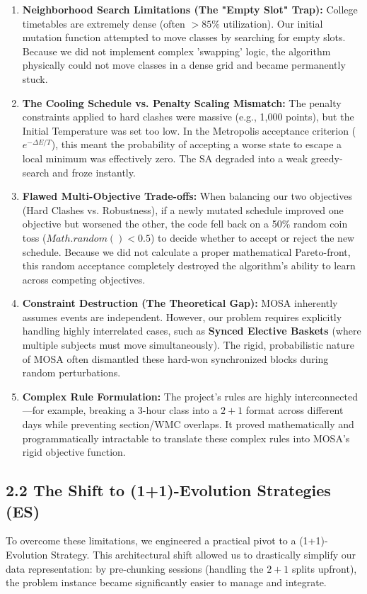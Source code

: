 \documentclass{article}
\begin{document}
\begin{enumerate}
    \item \textbf{Neighborhood Search Limitations (The "Empty Slot" Trap):} College timetables are extremely dense (often $> 85\%$ utilization). Our initial mutation function attempted to move classes by searching for empty slots. Because we did not implement complex 'swapping' logic, the algorithm physically could not move classes in a dense grid and became permanently stuck.
    \item \textbf{The Cooling Schedule vs. Penalty Scaling Mismatch:} The penalty constraints applied to hard clashes were massive (e.g., 1,000 points), but the Initial Temperature was set too low. In the Metropolis acceptance criterion ($e^{-\Delta E / T}$), this meant the probability of accepting a worse state to escape a local minimum was effectively zero. The SA degraded into a weak greedy-search and froze instantly.
    \item \textbf{Flawed Multi-Objective Trade-offs:} When balancing our two objectives (Hard Clashes vs. Robustness), if a newly mutated schedule improved one objective but worsened the other, the code fell back on a 50\% random coin toss ($Math.random() < 0.5$) to decide whether to accept or reject the new schedule. Because we did not calculate a proper mathematical Pareto-front, this random acceptance completely destroyed the algorithm's ability to learn across competing objectives.
    \item \textbf{Constraint Destruction (The Theoretical Gap):} MOSA inherently assumes events are independent. However, our problem requires explicitly handling highly interrelated cases, such as \textbf{Synced Elective Baskets} (where multiple subjects must move simultaneously). The rigid, probabilistic nature of MOSA often dismantled these hard-won synchronized blocks during random perturbations.
    \item \textbf{Complex Rule Formulation:} The project's rules are highly interconnected---for example, breaking a 3-hour class into a $2+1$ format across different days while preventing section/WMC overlaps. It proved mathematically and programmatically intractable to translate these complex rules into MOSA's rigid objective function.
\end{enumerate}

\subsection*{2.2 The Shift to (1+1)-Evolution Strategies (ES)}
To overcome these limitations, we engineered a practical pivot to a (1+1)-Evolution Strategy. This architectural shift allowed us to drastically simplify our data representation: by pre-chunking sessions (handling the $2+1$ splits upfront), the problem instance became significantly easier to manage and integrate.
\end{document}
